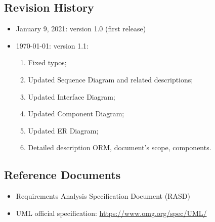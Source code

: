 \documentclass[table, 12pt]{article}
\begin{document}
\subsection{Revision History}
\begin{itemize}
    \item January 9, 2021: version 1.0 (first release)
    \item \today: version 1.1: \begin{enumerate}
              \item Fixed typos;
              \item Updated Sequence Diagram and related descriptions;
              \item Updated Interface Diagram;
              \item Updated Component Diagram;
              \item Updated ER Diagram;
              \item Detailed description ORM, document's scope, components.
          \end{enumerate}
\end{itemize}

\subsection{Reference Documents}
\begin{itemize}
    \item Requirements Analysis Specification Document (RASD)
    \item UML official specification: \href{https://www.omg.org/spec/UML/}{https://www.omg.org/spec/UML/}
\end{itemize}
\end{document}
